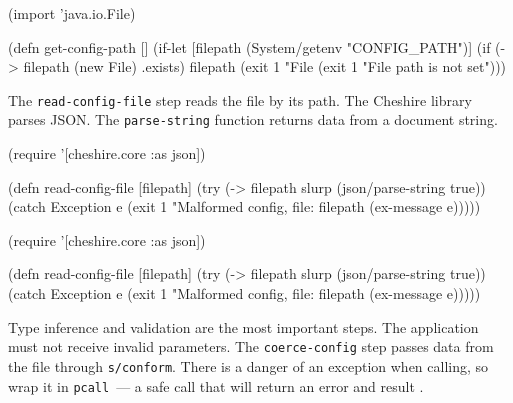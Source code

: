 \else

\begin{english}
  \begin{clojure}
(import 'java.io.File)

(defn get-config-path []
  (if-let [filepath (System/getenv "CONFIG_PATH")]
    (if (-> filepath (new File) .exists)
      filepath
      (exit 1 "File %
    (exit 1 "File path is not set")))
  \end{clojure}
\end{english}

\fi

The \verb|read-config-file| step reads the file by its path. The Cheshire library parses JSON. The \verb|parse-string| function returns data from a document string.


\ifx\DEVICETYPE\MOBILE

\begin{english}
  \begin{clojure}
(require '[cheshire.core :as json])

(defn read-config-file
  [filepath]
  (try
    (-> filepath
        slurp
        (json/parse-string true))
    (catch Exception e
      (exit 1
        "Malformed config,
                   file: %
            filepath (ex-message e)))))
  \end{clojure}
\end{english}

\else

\begin{english}
  \begin{clojure}
(require '[cheshire.core :as json])

(defn read-config-file
  [filepath]
  (try
    (-> filepath slurp (json/parse-string true))
    (catch Exception e
      (exit 1 "Malformed config, file: %
            filepath (ex-message e)))))
  \end{clojure}
\end{english}

\fi


Type inference and validation are the most important steps. The application must not receive invalid parameters. The \verb|coerce-config| step passes data from the file through \verb|s/conform|. There is a danger of an exception when calling, so wrap it in \verb|pcall|~--- a safe call that will return an error and result .


